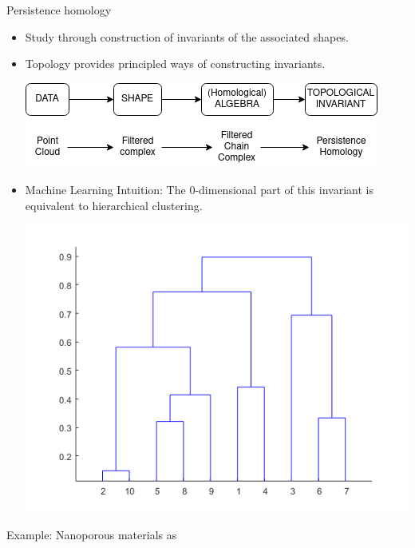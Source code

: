 \documentclass[10pt,t]{beamer} %
\begin{document}
\begin{frame}{Persistence homology}	
	\begin{itemize}
		\item Study through construction of invariants of the associated shapes.
		
		\pause
		
		\item Topology provides principled ways of constructing invariants.
		
		\vskip 10pt
		\begin{center}
			\includegraphics[scale=.5]{diagram}
		\end{center}
	
		\pause
		\item \textcolor{pblue}{Machine Learning Intuition}: The 0-dimensional part of this invariant is equivalent to hierarchical clustering.
		
		\begin{center}
			\includegraphics[scale=.2]{dendogram}
		\end{center}
	\end{itemize}	
\end{frame}

\begin{frame}{Example: Nanoporous materials}
	as
\end{frame}
\end{document}
